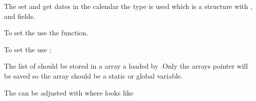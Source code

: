 \documentclass[letterpaper,10pt,english]{sphinxmanual}
\begin{document}
The set and get dates in the calendar the  type is used which is a structure with ,  and  fields.

To set the  use the  function.

To set the  use ;

The list of  should be stored in a  array a loaded by .Only the arrays pointer will be saved so the array should be a static or global variable.

The  can be adjusted with  where  looks like 
\end{document}
